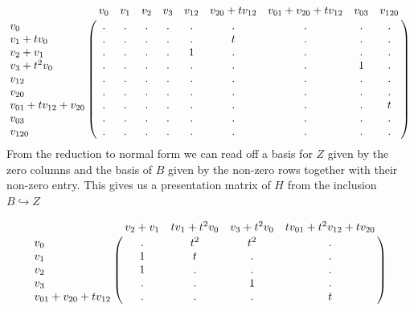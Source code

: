 \begin{example}

    \[
\bordermatrix{
    & v_{0} & v_{1} & v_{2} & v_{3} & v_{12} & v_{20}+tv_{12} & v_{01}+v_{20}+tv_{12} & v_{03} & v_{120}\cr
    v_{0}  &.&.&.&.&.&.&.&.&.\cr
    v_{1}+tv_{0}  &.&.&.&.&.&t&.&.&.\cr
    v_{2}+v_{1}  &.&.&.&.&1&.&.&.&.\cr
    v_{3}+t^{2}v_{0}  &.&.&.&.&.&.&.&1&.\cr
    v_{12} &.&.&.&.&.&.&.&.&.\cr
    v_{20} &.&.&.&.&.&.&.&.&.\cr
    v_{01}+tv_{12}+v_{20} &.&.&.&.&.&.&.&.&t\cr
    v_{03} &.&.&.&.&.&.&.&.&.\cr
    v_{120}&.&.&.&.&.&.&.&.&.
    }
  \]
  From the reduction to normal form we can read off a basis for $Z$ given by the zero columns and the basis of $B$ given by the non-zero rows together with their non-zero entry. This gives us a presentation matrix of $H$ from the inclusion $B \hookrightarrow Z$

  \[
    \bordermatrix{& v_{2}+v_{1} & tv_{1}+t^{2}v_{0} & v_{3}+t^{2}v_{0} & tv_{01}+t^{2}v_{12}+tv_{20} \cr
      v_{0} & . & t^{2} & t^{2} & . \cr
      v_{1} & 1 & t & . & .     \cr
      v_{2} & 1 & . & . & .     \cr
      v_{3} & . & . & 1 & .     \cr
      v_{01}+v_{20}+tv_{12}  & . & . & . & t
      }
  \]


\end{example}
